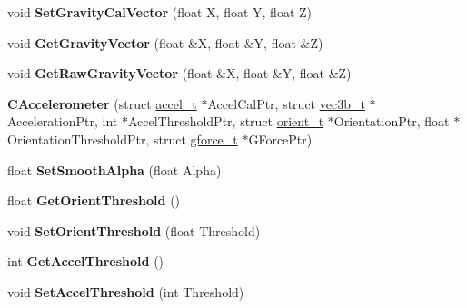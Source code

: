 \begin{DoxyCompactItemize}
\item 
\hypertarget{class_c_accelerometer_afa6961a116ebc581da421b17b3976e92}{void {\bfseries Set\-Gravity\-Cal\-Vector} (float X, float Y, float Z)}\label{class_c_accelerometer_afa6961a116ebc581da421b17b3976e92}

\item 
\hypertarget{class_c_accelerometer_ad2b57ead77ae9d6abe9d28b070e0f891}{void {\bfseries Get\-Gravity\-Vector} (float \&X, float \&Y, float \&Z)}\label{class_c_accelerometer_ad2b57ead77ae9d6abe9d28b070e0f891}

\item 
\hypertarget{class_c_accelerometer_af318f42e0e26b5122eb3a1d82919baa4}{void {\bfseries Get\-Raw\-Gravity\-Vector} (float \&X, float \&Y, float \&Z)}\label{class_c_accelerometer_af318f42e0e26b5122eb3a1d82919baa4}

\item 
\hypertarget{class_c_accelerometer_ac6a043c178545a10a47134638ab243df}{{\bfseries C\-Accelerometer} (struct \hyperlink{structaccel__t}{accel\-\_\-t} $\ast$Accel\-Cal\-Ptr, struct \hyperlink{structvec3b__t}{vec3b\-\_\-t} $\ast$Acceleration\-Ptr, int $\ast$Accel\-Threshold\-Ptr, struct \hyperlink{structorient__t}{orient\-\_\-t} $\ast$Orientation\-Ptr, float $\ast$Orientation\-Threshold\-Ptr, struct \hyperlink{structgforce__t}{gforce\-\_\-t} $\ast$G\-Force\-Ptr)}\label{class_c_accelerometer_ac6a043c178545a10a47134638ab243df}

\item 
\hypertarget{class_c_accelerometer_a09ce4dcabd897c0231569ebc9f476e6b}{float {\bfseries Set\-Smooth\-Alpha} (float Alpha)}\label{class_c_accelerometer_a09ce4dcabd897c0231569ebc9f476e6b}

\item 
\hypertarget{class_c_accelerometer_a5d4a662244592cf20751711c298781e5}{float {\bfseries Get\-Orient\-Threshold} ()}\label{class_c_accelerometer_a5d4a662244592cf20751711c298781e5}

\item 
\hypertarget{class_c_accelerometer_a4a5f3f55dce8a3a8a049ee38c121e00e}{void {\bfseries Set\-Orient\-Threshold} (float Threshold)}\label{class_c_accelerometer_a4a5f3f55dce8a3a8a049ee38c121e00e}

\item 
\hypertarget{class_c_accelerometer_a51262cabf03ac689875b6cb37f27f253}{int {\bfseries Get\-Accel\-Threshold} ()}\label{class_c_accelerometer_a51262cabf03ac689875b6cb37f27f253}

\item 
\hypertarget{class_c_accelerometer_a8e2e5501d5d151558206eb61f0e24b99}{void {\bfseries Set\-Accel\-Threshold} (int Threshold)}\label{class_c_accelerometer_a8e2e5501d5d151558206eb61f0e24b99}


\end{DoxyCompactItemize}
